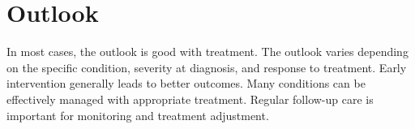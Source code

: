 \section{Outlook}
In most cases, the outlook is good with treatment. The outlook varies depending on the specific condition, severity at diagnosis, and response to treatment. Early intervention generally leads to better outcomes. Many conditions can be effectively managed with appropriate treatment. Regular follow-up care is important for monitoring and treatment adjustment.

